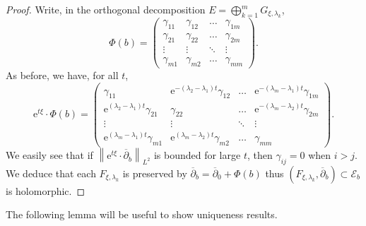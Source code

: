 \documentclass{article}
\theoremstyle{remark}
\theoremstyle{definition}
\newcommand{\e}{\boldsymbol{\mathrm{e}}}
\newcommand{\norme}[1]{\left\| #1 \right\|}
\newcommand{\E}{\mathcal{E}}
\newcommand{\dbar}{\overline{\partial}}
\begin{document}
\begin{proof}
\noindent{} Write, in the orthogonal decomposition $E = \bigoplus_{k = 1}^m G_{\xi,\lambda_k}$,
$$
\Phi(b) =
\begin{pmatrix}
\gamma_{11} & \gamma_{12} & \hdots & \gamma_{1m}\\
\gamma_{21} & \gamma_{22} & \hdots & \gamma_{2m}\\
\vdots & \vdots & \ddots & \vdots\\
\gamma_{m1} & \gamma_{m2} & \hdots & \gamma_{mm}
\end{pmatrix}.
$$
As before, we have, for all $t$,
$$
\e^{t\xi} \cdot \Phi(b) =
\begin{pmatrix}
\gamma_{11} & \e^{-(\lambda_2 - \lambda_1)t}\gamma_{12} & \hdots & \e^{-(\lambda_m - \lambda_1)t}\gamma_{1m}\\
\e^{(\lambda_2 - \lambda_1)t}\gamma_{21} & \gamma_{22} & \hdots & \e^{-(\lambda_m - \lambda_2)t}\gamma_{2m}\\
\vdots & \vdots & \ddots & \vdots\\
\e^{(\lambda_m - \lambda_1)t}\gamma_{m1} & \e^{(\lambda_m - \lambda_2)t}\gamma_{m2} & \hdots & \gamma_{mm}
\end{pmatrix}.
$$
We easily see that if $\norme{\e^{t\xi} \cdot \dbar_b}_{L^2}$ is bounded for large $t$, then $\gamma_{ij} = 0$ when $i > j$. We deduce that each $F_{\xi,\lambda_k}$ is preserved by $\dbar_b = \dbar_0 + \Phi(b)$ thus $(F_{\xi,\lambda_k},\dbar_b) \subset \E_b$ is holomorphic.
\end{proof}

The following lemma will be useful to show uniqueness results.
\end{document}
